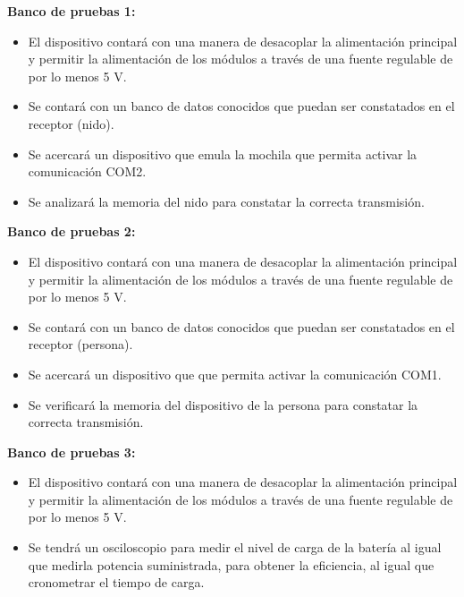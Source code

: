 
\textbf{Banco de pruebas 1:}
\begin{itemize}
	\item El dispositivo contará con una manera de desacoplar la alimentación principal y permitir la alimentación de los módulos a través de una fuente regulable de por lo menos 5 V.%
	\item Se contará con un banco de datos conocidos que puedan ser constatados en el receptor (nido).	
	\item Se acercará un dispositivo que emula la mochila que permita activar la comunicación COM2.
	\item Se analizará la memoria del nido para constatar la correcta transmisión.
\end{itemize}

\textbf{Banco de pruebas 2:}
\begin{itemize}
	\item El dispositivo contará con una manera de desacoplar la alimentación principal y permitir la alimentación de los módulos a través de una fuente regulable de por lo menos 5 V.%
	\item Se contará con un banco de datos conocidos que puedan ser constatados en el receptor (persona).	
	\item Se acercará un dispositivo que que permita activar la comunicación COM1.
	\item Se verificará la memoria del dispositivo de la persona para constatar la correcta transmisión.
\end{itemize}

\textbf{Banco de pruebas 3:}
\begin{itemize}
	\item El dispositivo contará con una manera de desacoplar la alimentación principal y permitir la alimentación de los módulos a través de una fuente regulable de por lo menos 5 V.%
	\item Se tendrá un osciloscopio para medir el nivel de carga de la batería al igual que medirla potencia suministrada, para obtener la eficiencia, al igual que cronometrar el tiempo de carga.
\end{itemize}

